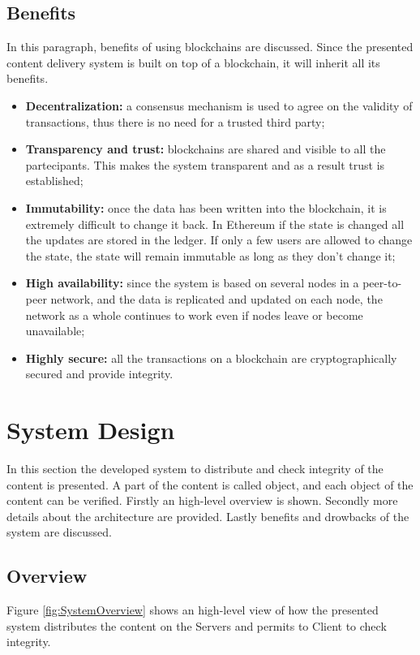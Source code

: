 \documentclass[conference,compsoc]{IEEEtran}
\begin{document}
\subsection{Benefits}
In this paragraph, benefits of using blockchains are discussed. Since the presented content delivery system is built on top of a blockchain, it will inherit all its benefits.
\begin{itemize}
	\item \textbf{Decentralization:} a consensus mechanism is used to agree on the validity of transactions, thus there is no need for a trusted third party;
	
	\item \textbf{Transparency and trust:} blockchains are shared and visible to all the partecipants. This makes the system transparent and as a result trust is established;
	
	\item \textbf{Immutability:} once the data has been written into the blockchain, it is extremely difficult to change it back. In Ethereum if the state is changed all the updates are stored in the ledger. If only a few users are allowed to change the state, the state will remain immutable as long as they don't change it;
	
	\item \textbf{High availability:} since the system is based on several nodes in a peer-to-peer network, and the data is replicated and updated on each node, the network as a whole continues to work even if nodes leave or become unavailable;
	
	\item \textbf{Highly secure:} all the transactions on a blockchain are cryptographically secured and provide integrity.
	\vspace{10pt}
\end{itemize} 

\section{System Design}
In this section the developed system to distribute and check integrity of the content is presented. A part of the content is called object, and each object of the content can be verified. Firstly an high-level overview is shown. Secondly more details about the architecture are provided. Lastly benefits and drowbacks of the system are discussed.

\subsection{Overview}
Figure \ref{fig:SystemOverview} shows an high-level view of how the presented system distributes the content on the Servers and permits to Client to check integrity.
\end{document}
